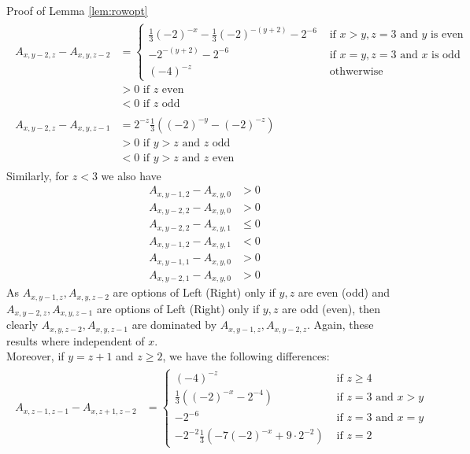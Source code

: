 \begin{proof2}{Proof of Lemma \ref{lem:rowopt}}
\begin{align*}
\begin{split}
A_{x,y-2,z}-A_{x,y,z-2}&=\left\{
\begin{array}{ll}
\frac{1}{3}(-2)^{-x}-\frac{1}{3}(-2)^{-(y+2)}-2^{-6}&\text{ if $x>y,z=3$ and $y$ is even}\\
-2^{-(y+2)}-2^{-6}&\text{ if $x=y,z=3$ and $x$ is odd}\\
(-4)^{-z}&\text{ othwerwise}
\end{array}\right.\\
&>0\text{ if $z$ even}\\
&<0\text{ if $z$ odd}
\end{split}\\
\begin{split}
A_{x,y-2,z}-A_{x,y,z-1}&=2^{-z}\frac{1}{3}\left((-2)^{-y}-(-2)^{-z}\right)\\
&>0\text{ if $y>z$ and $z$ odd}\\
&<0\text{ if $y>z$ and $z$ even}
\end{split}
\end{align*}
Similarly, for $z<3$ we also have
\begin{align*}
A_{x,y-1,2}-A_{x,y,0}&>0\\
A_{x,y-2,2}-A_{x,y,0}&>0\\
A_{x,y-2,2}-A_{x,y,1}&\le0\\
A_{x,y-1,2}-A_{x,y,1}&<0\\
A_{x,y-1,1}-A_{x,y,0}&>0\\
A_{x,y-2,1}-A_{x,y,0}&>0
\end{align*}
As $A_{x,y-1,z},A_{x,y,z-2}$ are options of Left (Right) only if $y,z$ are even (odd) and $A_{x,y-2,z},A_{x,y,z-1}$ are options of Left (Right) only if $y,z$ are odd (even), then clearly $A_{x,y,z-2},A_{x,y,z-1}$ are dominated by $A_{x,y-1,z},A_{x,y-2,z}$. Again, these results where independent of $x$.
\\
Moreover, if $y=z+1$ and $z\ge2$, we have the following differences:
\begin{align*}
\begin{split}
A_{x,z-1,z-1}-A_{x,z+1,z-2}&=\left\{
\begin{array}{ll}
(-4)^{-z}&\text{ if $z\ge4$}\\
\frac{1}{3}\left((-2)^{-x}-2^{-4}\right)&\text{ if $z=3$ and $x>y$}\\
-2^{-6}&\text{ if $z=3$ and $x=y$}\\
-2^{-2}\frac{1}{3}\left(-7(-2)^{-x}+9\cdot2^{-2}\right)&\text{ if $z=2$}
\end{array}\right.\\

\end{split}
\end{align*}
\end{proof2}
